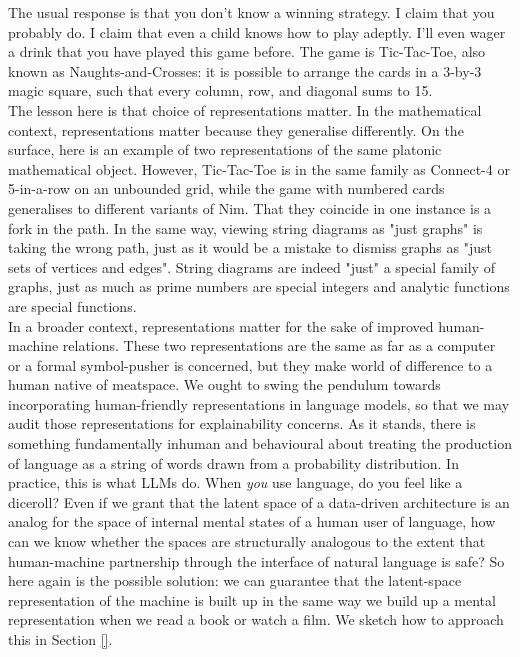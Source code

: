 The usual response is that you don't know a winning strategy. I claim that you probably do. I claim that even a child knows how to play adeptly. I'll even wager a drink that you have played this game before. The game is Tic-Tac-Toe, also known as Naughts-and-Crosses: it is possible to arrange the cards in a 3-by-3 magic square, such that every column, row, and diagonal sums to 15.\\

The lesson here is that choice of representations matter. In the mathematical context, representations matter because they generalise differently. On the surface, here is an example of two representations of the same platonic mathematical object. However, Tic-Tac-Toe is in the same family as Connect-4 or 5-in-a-row on an unbounded grid, while the game with numbered cards generalises to different variants of Nim. That they coincide in one instance is a fork in the path. In the same way, viewing string diagrams as "just graphs" is taking the wrong path, just as it would be a mistake to dismiss graphs as "just sets of vertices and edges". String diagrams are indeed "just" a special family of graphs, just as much as prime numbers are special integers and analytic functions are special functions.\\

In a broader context, representations matter for the sake of improved human-machine relations. These two representations are the same as far as a computer or a formal symbol-pusher is concerned, but they make world of difference to a human native of meatspace. We ought to swing the pendulum towards incorporating human-friendly representations in language models, so that we may audit those representations for explainability concerns. As it stands, there is something fundamentally inhuman and behavioural about treating the production of language as a string of words drawn from a probability distribution. In practice, this is what LLMs do. When \emph{you} use language, do you feel like a diceroll? Even if we grant that the latent space of a data-driven architecture is an analog for the space of internal mental states of a human user of language, how can we know whether the spaces are structurally analogous to the extent that human-machine partnership through the interface of natural language is safe? So here again is the possible solution: we can guarantee that the latent-space representation of the machine is built up in the same way we build up a mental representation when we read a book or watch a film. We sketch how to approach this in Section \ref{}.

